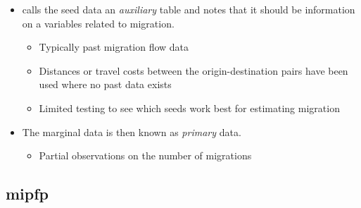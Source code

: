 \documentclass[
]{book}
\providecommand{\tightlist}{%
  \setlength{\itemsep}{0pt}\setlength{\parskip}{0pt}}
\begin{document}
\begin{itemize}
\tightlist
\item
  \citet{Willekens1999} calls the seed data an \emph{auxiliary} table and notes that it should be information on a variables related to migration.

  \begin{itemize}
  \tightlist
  \item
    Typically past migration flow data
  \item
    Distances or travel costs between the origin-destination pairs have been used where no past data exists
  \item
    Limited testing to see which seeds work best for estimating migration
  \end{itemize}
\item
  The marginal data is then known as \emph{primary} data.

  \begin{itemize}
  \tightlist
  \item
    Partial observations on the number of migrations
  \end{itemize}
\end{itemize}

\hypertarget{mipfp}{%
\subsection{mipfp}\label{mipfp}}
\end{document}
